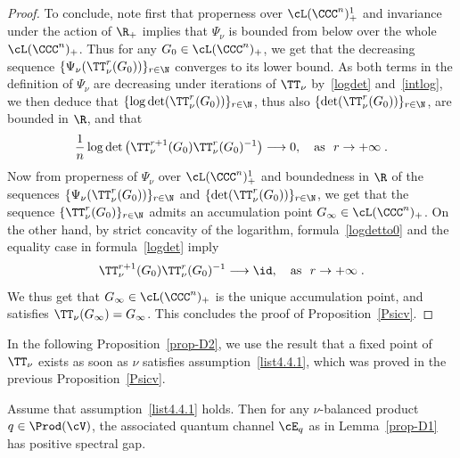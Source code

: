 \begin{proof}
To conclude, note first that properness over $\cL(\CCC^n)_+^1$ and invariance under the action of $\R_+$ implies that $\Psi_\nu$ is bounded from below over the whole $\cL(\CCC^n)_+$. Thus for any $G_0\in\cL(\CCC^n)_+$, we get that the decreasing sequence $\{\Psi_\nu(\TT_\nu^r(G_0))\}_{r\in\N}$ converges to its lower bound. As both terms in the definition of $\Psi_\nu$ are decreasing under iterations of $\TT_\nu$ by~\eqref{logdet} and~\eqref{intlog}, we then deduce that $\{\log\det(\TT_\nu^r(G_0))\}_{r\in\N}$, thus also $\{\det(\TT_\nu^r(G_0))\}_{r\in\N}$, are bounded in $\R$, and that
\begin{equation}\label{logdetto0}
\frac{1}{n}\log\det\left(
\TT_\nu^{r+1}(G_0)\TT_\nu^r(G_0)^{-1}\right)
\longrightarrow 0,\quad\text{as}~~r\to+\infty\;.
\end{equation}
Now from properness of $\Psi_\nu$ over $\cL(\CCC^n)_+^1$ and boundedness in $\R$ of the sequences $\{\Psi_\nu(\TT_\nu^r(G_0))\}_{r\in\N}$ and $\{\det(\TT_\nu^r(G_0))\}_{r\in\N}$, we get that the sequence $\{\TT_\nu^r(G_0)\}_{r\in\N}$ admits an accumulation point $G_\infty\in\cL(\CCC^n)_+$. On the other hand, by strict concavity of the logarithm, formula~\eqref{logdetto0} and the equality case in formula~\eqref{logdet} imply
\begin{equation}
\TT_\nu^{r+1}(G_0)\TT_\nu^r(G_0)^{-1}
\longrightarrow\id,\quad\text{as}~~r\to+\infty\;.
\end{equation}
We thus get that $G_\infty\in\cL(\CCC^n)_+$ is the unique accumulation point, and satisfies $\TT_\nu(G_\infty)=G_\infty$. This concludes the proof of Proposition~\ref{Psicv}.
\end{proof}

In the following Proposition~\ref{prop-D2}, we use the result that a fixed point of $\TT_\nu$ exists as soon as $\nu$ satisfies assumption~\eqref{list4.4.1}, which was proved in the previous Proposition~\ref{Psicv}.
%

\begin{prop}\label{prop-D2}
Assume that assumption~\eqref{list4.4.1} holds. Then for any $\nu$-balan\-ced product $q\in\Prod(\cV)$, the associated quantum channel $\cE_q$ as in Lemma~\ref{prop-D1} has positive spectral gap.
\end{prop}


